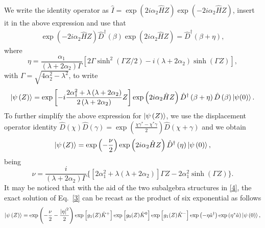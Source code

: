 \documentclass[12pt]{article}
\numberwithin{equation}{section}
\begin{document}
We write the identity operator as $\hat{I}= \exp\left(2 i \alpha_{2} \hat{H} Z \right)  \exp\left(-2 i \alpha_{2} \hat{H} Z \right)$, insert it in the above expression and use that
\begin{align} \label{9}
\exp\left(-2 i \alpha_{2} \hat{H} Z \right)  \hat{D}^\dagger \left(\beta\right)
\exp\left(2 i \alpha_{2} \hat{H} Z \right)=\hat{D}^\dagger\left(\beta+\eta\right),
\end{align}
where 
\begin{equation} \label{10}
\eta= \frac{\alpha_{1}}{\left(\lambda + 2 \alpha_{2}\right) \Gamma}\left[2 \Gamma \sinh^2\left( \Gamma Z/2\right) - i \left(\lambda + 2 \alpha_{2} \right) \sinh\left( \Gamma Z\right) \right],
\end{equation}
with $\Gamma = \sqrt{4 \alpha^2_{2}-\lambda^2}$, to write
\begin{equation} \label{11}
\ket{\psi\left(Z\right)}= \exp\left[-i \frac{2 \alpha^2_{1} + \lambda \left(\lambda  + 2 \alpha_{2} \right)}{2 \left(\lambda + 2 \alpha_2 \right)} Z\right] 
\exp\left( 2 i \alpha_{2} \hat{H} Z \right)
\hat{D}^\dagger \left(\beta+\eta\right)
\hat{D}\left(\beta\right)  
\ket{\psi(0)}.
\end{equation}
To further simplify the above expression for $\ket{\psi\left(Z\right)}$, we use the displacement operator identity $\hat{D}\left(\chi\right) \hat{D}\left(\gamma\right)=\exp\left(\frac{\chi \gamma^{*}-\chi^{*}\gamma}{2}\right) \hat{D}\left(\chi+\gamma\right)$ and we obtain
\begin{equation} \label{12}
\ket{\psi\left(Z\right)}=\exp\left(-\frac{\nu}{2}\right)
\exp\left( 2 i \alpha_{2} \hat{H} Z \right)
\hat{D}^\dagger\left(\eta\right) 
\ket{\psi\left(0\right)},
\end{equation}
being
\begin{equation} \label{13}
\nu=\frac{i}{ \left(\lambda + 2 \alpha_{2} \right)\Gamma} \Bigg\lbrace \left[2 \alpha^2_{1} + \lambda \left(\lambda + 2 \alpha_{2} \right)\right] \Gamma Z- 2 \alpha^2_{1} \sinh\left(\Gamma Z\right) \Bigg\rbrace.
\end{equation}
It may be noticed that with the aid of the two subalgebra structures in \eqref{4}, the exact solution of Eq.~\eqref{3} can be recast as the product of six exponential as follows
\begin{equation} \label{14}
\ket{\psi\left(Z\right)}=
\exp\left(-\frac{\nu}{2}-\frac{\abs{\eta}^2}{2}\right)
\exp\left[g_{1}(Z) \hat{K}^{+}\right] \exp\left[g_{0}(Z) \hat{K}^{0}\right] \exp\left[g_{1}(Z) \hat{K}^{-}\right]
\exp\left(-\eta \hat{a}^{\dagger} \right)  \exp\left(\eta^* \hat{a}\right)\ket{\psi\left(0\right)},
\end{equation}
\end{document}
